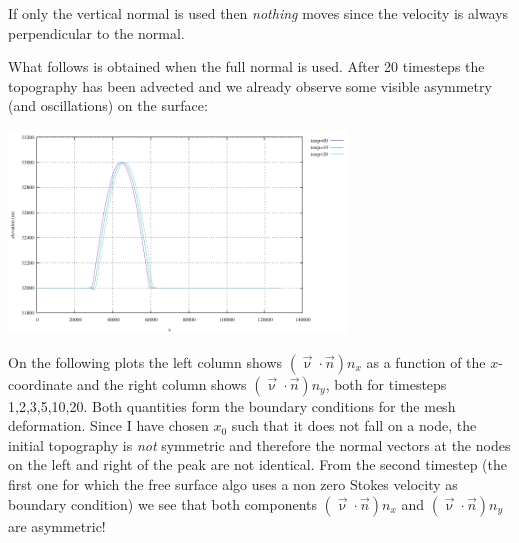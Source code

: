 If only the vertical normal is used then {\sl nothing} moves since the 
velocity is always perpendicular to the normal. 

What follows is obtained when the full normal is used. 
After 20 timesteps the topography has been advected and we already observe some 
visible asymmetry (and oscillations) on the surface:
\begin{center}
\includegraphics[width=9cm]{python_codes/fieldstone_54/images/exp7/surface.pdf}
\end{center}

On the following plots the left column shows $(\vec{\upnu}\cdot \vec{n})n_x$ 
as a function of the $x$-coordinate and the 
right column shows $(\vec{\upnu}\cdot \vec{n})n_y$, both for timesteps 1,2,3,5,10,20. 
Both quantities form the 
boundary conditions for the mesh deformation.  
Since I have chosen $x_0$ such that it does not fall on a node, the initial 
topography is {\sl not} symmetric and therefore the normal vectors at the nodes 
on the left and right of the peak are not identical. From the second timestep (the first one 
for which the free surface algo uses a non zero Stokes velocity as boundary condition)
we see that both components $(\vec{\upnu}\cdot \vec{n})n_x$ and $(\vec{\upnu}\cdot \vec{n})n_y$ are asymmetric! 


